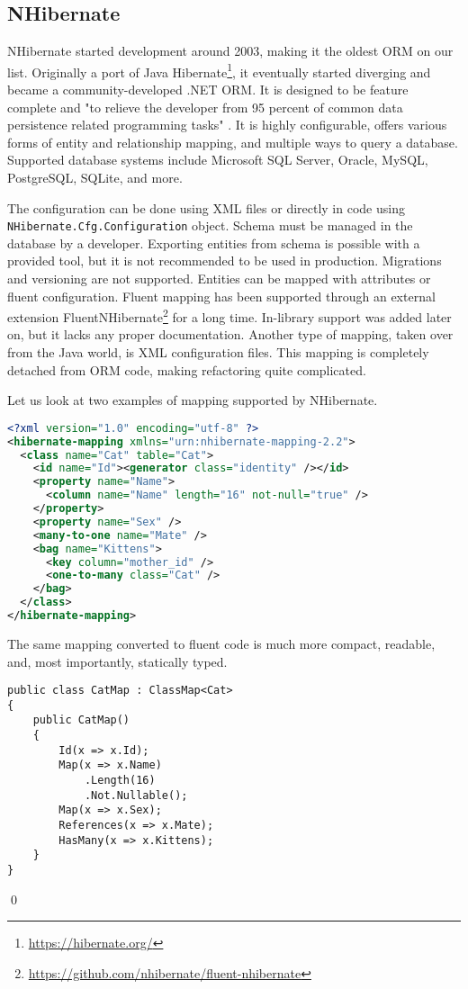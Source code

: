 \subsection{NHibernate}


NHibernate \cite{nhibernate, nhibernateRepo} started development around 2003, making it the oldest ORM on our list. Originally a port of Java Hibernate\footnote{\url{https://hibernate.org/}}, it eventually started diverging and became a community-developed .NET ORM. It is designed to be feature complete and "to relieve the developer from 95 percent of common data persistence related programming tasks" \cite{nhibernate}. 
It is highly configurable, offers various forms of entity and relationship mapping, and multiple ways to query a database. Supported database systems include Microsoft SQL Server, Oracle, MySQL, PostgreSQL, SQLite, and more.

The configuration can be done using XML files or directly in code using \texttt{NHibernate.Cfg.Configuration} object. 
Schema must be managed in the database by a developer. Exporting entities from schema is possible with a provided tool, but it is not recommended to be used in production. Migrations and versioning are not supported. Entities can be mapped with attributes or fluent configuration. Fluent mapping has been supported through an external extension FluentNHibernate\footnote{\url{https://github.com/nhibernate/fluent-nhibernate}} for a long time. In-library support was added later on, but it lacks any proper documentation. Another type of mapping, taken over from the Java world, is XML configuration files. This mapping is completely detached from ORM code, making refactoring quite complicated.


\begin{example}
\small
Let us look at two examples\cite{fluentNH} of mapping supported by NHibernate. 

\begin{lstlisting}[language=xml]
<?xml version="1.0" encoding="utf-8" ?>  
<hibernate-mapping xmlns="urn:nhibernate-mapping-2.2">  
  <class name="Cat" table="Cat">  
    <id name="Id"><generator class="identity" /></id>  
    <property name="Name">  
      <column name="Name" length="16" not-null="true" />  
    </property> 
    <property name="Sex" /> 
    <many-to-one name="Mate" />  
    <bag name="Kittens">  
      <key column="mother_id" />  
      <one-to-many class="Cat" />  
    </bag>  
  </class>  
</hibernate-mapping> 
\end{lstlisting}

The same mapping converted to fluent code is much more compact, readable, and, most importantly, statically typed. 

\begin{lstlisting}[language=CSharp]
public class CatMap : ClassMap<Cat>
{
    public CatMap()
    {
        Id(x => x.Id);
        Map(x => x.Name)
            .Length(16)
            .Not.Nullable();
        Map(x => x.Sex);
        References(x => x.Mate);
        HasMany(x => x.Kittens);
    }
}
\end{lstlisting}
\qed
\end{example}

